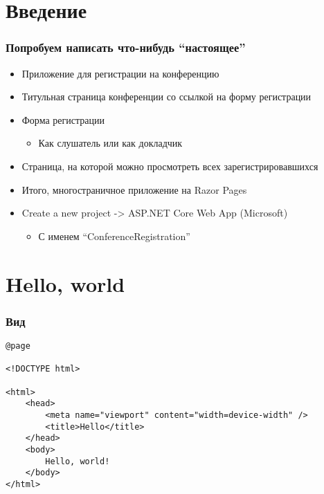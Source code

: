 \documentclass{../../slides-style}
\begin{document}
    \begin{frame}[plain]
        \titlepage
    \end{frame}

    \section{Введение}

    \begin{frame}
        \frametitle{Попробуем написать что-нибудь \enquote{настоящее}}
        \begin{itemize}
            \item Приложение для регистрации на конференцию
            \item Титульная страница конференции со ссылкой на форму регистрации
            \item Форма регистрации
            \begin{itemize}
                \item Как слушатель или как докладчик
            \end{itemize}
            \item Страница, на которой можно просмотреть всех зарегистрировавшихся
            \item Итого, многостраничное приложение на Razor Pages
            \item Create a new project -> ASP.NET Core Web App (Microsoft)
            \begin{itemize}
                \item С именем \enquote{ConferenceRegistration}
            \end{itemize}
        \end{itemize}
    \end{frame}

    \section{Hello, world}

    \begin{frame}[fragile]
        \frametitle{Вид}
        \begin{verbatim}
@page

<!DOCTYPE html>

<html>
    <head>
        <meta name="viewport" content="width=device-width" />
        <title>Hello</title>
    </head>
    <body>
        Hello, world!
    </body>
</html>
        \end{verbatim}
    \end{frame}
\end{document}
